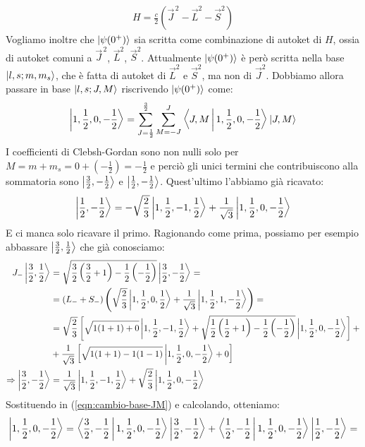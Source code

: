 \documentclass[../../FisicaTeorica.tex]{subfiles}
\begin{document}
\begin{enumerate}
\begin{align*}
H=\frac{c}{2}(\vec{J}^{\,2}-\vec{L}^2 - \vec{S}^2)
\end{align*}
Vogliamo inoltre che $\Ket{\psi(0^+)}$ sia scritta come combinazione di autoket di $H$, ossia di autoket comuni a $\vec{J}^{\,2}$, $\vec{L}^2$, $\vec{S}^2$. Attualmente $\Ket{\psi(0^+)}$ è però scritta nella base $\Ket{l,s;m, m_s}$, che è fatta di autoket di $\vec{L}^2$ e $\vec{S}^2$, ma non di $\vec{J}^2$. Dobbiamo allora passare in base $\Ket{l,s; J, M}$ riscrivendo $\Ket{\psi(0^+)}$ come:
\begin{align}
\Ket{1,\frac{1}{2},0,-\frac{1}{2}}=\sum_{J=\frac{1}{2}}^{\frac{3}{2}} \sum_{M=-J}^{J} \Braket{J,M|1,\frac{1}{2},0,-\frac{1}{2}} \Ket{J,M}
\label{eqn:cambio-base-JM}
\end{align}
I coefficienti di Clebsh-Gordan sono non nulli solo per $M=m+m_s=0+(-\frac{1}{2})=-\frac{1}{2}$ e perciò gli unici termini che contribuiscono alla sommatoria sono $\Ket{\frac{3}{2},-\frac{1}{2}}$ e $\Ket{\frac{1}{2},-\frac{1}{2}}$. Quest'ultimo l'abbiamo già ricavato:
\[
\Ket{\frac{1}{2},-\frac{1}{2}}=-\sqrt{\frac{2}{3}}\Ket{1,\frac{1}{2},-1,\frac{1}{2}} + \frac{1}{\sqrt{3}}\Ket{1,\frac{1}{2},0,-\frac{1}{2}}
\]
E ci manca solo ricavare il primo. Ragionando come prima, possiamo per esempio abbassare $\Ket{\frac{3}{2}, \frac{1}{2}}$ che già conosciamo:
\begin{align*}
J_- \Ket{\frac{3}{2},\frac{1}{2}}&=\sqrt{\frac{3}{2}\left(\frac{3}{2}+1\right)-\frac{1}{2}\left(-\frac{1}{2}\right)}\Ket{\frac{3}{2},-\frac{1}{2}} =\\
&=(L_- + S_-)\left(\sqrt{\frac{2}{3}}\Ket{1,\frac{1}{2},0,\frac{1}{2}} +\frac{1}{\sqrt{3}}\Ket{1,\frac{1}{2},1,-\frac{1}{2}}\right)=\\
&=\sqrt{\frac{2}{3}}\left[\sqrt{1(1+1)+0}\Ket{1,\frac{1}{2},-1,\frac{1}{2}}+\sqrt{\frac{1}{2}\left(\frac{1}{2}+1\right)-\frac{1}{2}\left(-\frac{1}{2}\right)}\Ket{1,\frac{1}{2},0,-\frac{1}{2}}\right]+\\
&+\frac{1}{\sqrt{3}}\left[ \sqrt{1(1+1)-1(1-1)}\Ket{1,\frac{1}{2},0,-\frac{1}{2}} + 0 \right]\\
\Rightarrow \Ket{\frac{3}{2},-\frac{1}{2}} &= \frac{1}{\sqrt{3}}\Ket{1,\frac{1}{2},-1,\frac{1}{2}}+\sqrt{\frac{2}{3}}\Ket{1,\frac{1}{2},0,-\frac{1}{2}}
\end{align*}
Sostituendo in (\ref{eqn:cambio-base-JM}) e calcolando, otteniamo:
\begin{align*}
\ket{1,\frac{1}{2},0,-\frac{1}{2}} &= \braket{\frac{3}{2},-\frac{1}{2}|1,\frac{1}{2},0,-\frac{1 }{2}}\ket{\frac{3}{2},-\frac{1}{2}}+ \braket{\frac{1}{2},-\frac{1}{2}|1,\frac{1}{2},0,-\frac{1}{2}}\ket{\frac{1}{2},-\frac{1}{2}}=\\

\end{align*}
\end{enumerate}
\end{document}
